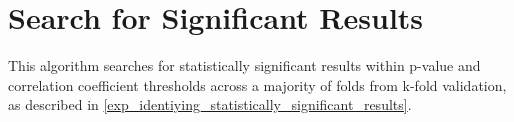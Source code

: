 \chapter{Search for Significant Results}
\label{search_for_correlation_coefficients}

This algorithm searches for statistically significant results within p-value and
\tau{} correlation coefficient thresholds across a majority of folds from k-fold
validation, as described in
\cref{exp_identiying_statistically_significant_results}.

\begin{figure}[h]

\end{figure}
\begin{figure}[h]

\end{figure}
\begin{figure}[h]

\end{figure}
